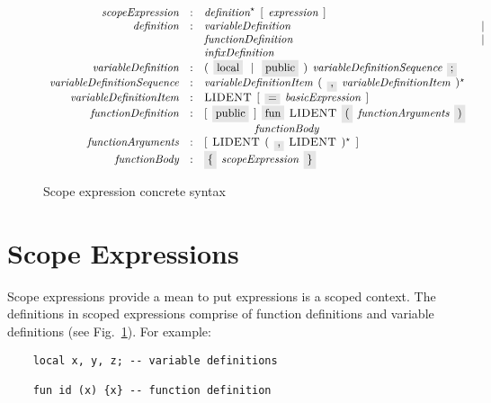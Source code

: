 \begin{figure}[t]
  \[
    \begin{array}{rclc}
      \defterm{scopeExpression}                & : & \nonterm{definition}^\star\s[\s\nonterm{expression}\s]&\\
      \defterm{definition}                     & : & \nonterm{variableDefinition}&\alt\\
                                               &   & \nonterm{functionDefinition}&\alt\\
                                               &   & \nonterm{infixDefinition}&\\
      \defterm{variableDefinition}             & : & (\s\term{local}\alt\term{public}\s)\s\nonterm{variableDefinitionSequence}\s\term{;}&\\
      \defterm{variableDefinitionSequence}     & : & \nonterm{variableDefinitionItem}\s(\s\term{,}\s\nonterm{variableDefinitionItem}\s)^\star&\\
      \defterm{variableDefinitionItem}         & : & \token{LIDENT}\s[\s\term{=}\s\nonterm{basicExpression}\s]&\\
      \defterm{functionDefinition}             & : & [\s\term{public}\s]\s\term{fun}\s\token{LIDENT}\s\term{(}\s\nonterm{functionArguments}\s\term{)}&\\
                                               &   & \phantom{XXXXX}\nonterm{functionBody}&\\
      \defterm{functionArguments}              & : & [\s\token{LIDENT}\s(\s\term{,}\s\token{LIDENT}\s)^\star\s]&\\
      \defterm{functionBody}                   & : & \term{\{}\s\nonterm{scopeExpression}\s\term{\}}&
    \end{array}
  \]
  \caption{Scope expression concrete syntax}
  \label{scope_expression}
\end{figure}

\section{Scope Expressions}
\label{sec:scope_expressions}

Scope expressions provide a mean to put expressions is a scoped context. The definitions in scoped expressions comprise of function definitions and
variable definitions (see Fig.~\ref{scope_expression}). For example:

\begin{lstlisting}
    local x, y, z; -- variable definitions

    fun id (x) {x} -- function definition
\end{lstlisting}

